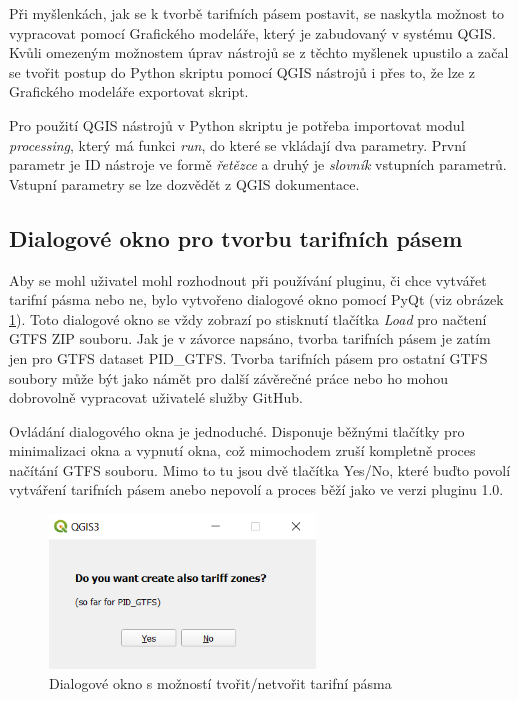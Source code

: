 Při myšlenkách, jak se k tvorbě tarifních pásem postavit,
se naskytla možnost to vypracovat pomocí Grafického modeláře, který je zabudovaný v systému QGIS. 
Kvůli omezeným možnostem úprav nástrojů se z těchto myšlenek upustilo a začal se tvořit postup
do  Python skriptu pomocí QGIS nástrojů i přes to, že lze z Grafického modeláře exportovat skript. 

Pro použití QGIS nástrojů v Python skriptu je potřeba importovat modul \textit{processing},
který má funkci \textit{run}, do které se vkládají dva parametry. První parametr je ID nástroje
ve formě \textit{řetězce} a druhý je \textit{slovník} vstupních parametrů. Vstupní parametry se lze dozvědět
z QGIS dokumentace. \cite{QGIS_docs}

\subsection{Dialogové okno pro tvorbu tarifních pásem}

Aby se mohl uživatel mohl rozhodnout při používání pluginu, či chce vytvářet tarifní pásma nebo ne, bylo vytvořeno
dialogové okno pomocí PyQt (viz obrázek \ref{fig:dialog}). Toto dialogové okno se vždy zobrazí po stisknutí tlačítka
\textit{Load} pro načtení GTFS ZIP souboru. Jak je v závorce napsáno, tvorba tarifních pásem je zatím jen pro GTFS
dataset PID\_GTFS.
Tvorba tarifních pásem pro ostatní GTFS soubory může být jako námět pro další závěrečné práce nebo ho mohou dobrovolně
vypracovat uživatelé služby GitHub.

Ovládání dialogového okna je jednoduché. Disponuje běžnými tlačítky pro minimalizaci okna a vypnutí okna, což mimochodem
zruší kompletně proces načítání GTFS souboru. Mimo to tu jsou dvě tlačítka Yes/No, které buďto povolí vytváření tarifních
pásem anebo nepovolí a proces běží jako ve verzi pluginu 1.0.

\begin{figure}[H] \centering
    \includegraphics[width=200pt]{./pictures/dialog.png}
    \caption[Dialogové okno s možností tvořit/netvořit tarifní pásma]{Dialogové okno s možností tvořit/netvořit tarifní pásma}
	\label{fig:dialog}                                
\end{figure}

